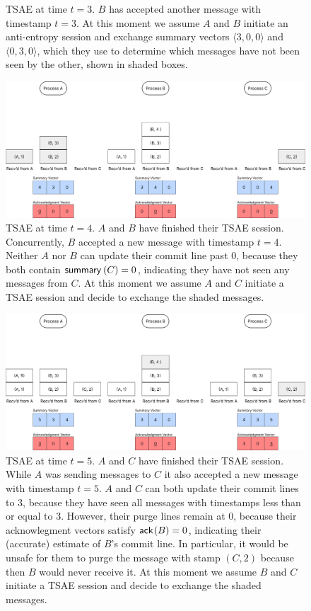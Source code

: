 \documentclass[]             %
{NASA}                       %
\theoremstyle{definition}
\begin{document}
\begin{landscape}
\begin{figure}[h]
    \caption{TSAE at time $t=3$. $B$ has accepted another message with timestamp $t = 3$. At this moment we assume $A$ and $B$ initiate an anti-entropy session and exchange summary vectors $\langle 3,0,0\rangle$ and $\langle 0,3,0 \rangle$, which they use to determine which messages have not been seen by the other, shown in shaded boxes.}
    \label{fig:tsae3}
  \end{figure}
  \begin{figure}[h]
    \centering
    \includegraphics[width=1.4\textwidth]{images/tsae/TSAE4.png}
    \caption{TSAE at time $t=4$. $A$ and $B$ have finished their TSAE session. Concurrently, $B$ accepted a new message with timestamp $t=4$. Neither $A$ nor $B$ can update their commit line past $0$, because they both contain $\textsf{summary}_{}\left(C\right) = 0$, indicating they have not seen any messages from $C$. At this moment we assume $A$ and $C$ initiate a TSAE session and decide to exchange the shaded messages.}
    \label{fig:tsae4}
  \end{figure}
  \begin{figure}[h]
    \centering
    \includegraphics[width=1.4\textwidth]{images/tsae/TSAE5.png}
    \caption{TSAE at time $t=5$. $A$ and $C$ have finished their TSAE session. While $A$ was sending messages to $C$ it also accepted a new message with timestamp $t=5$. $A$ and $C$ can both update their commit lines to $3$, because they have seen all messages with timestamps less than or equal to $3$. However, their purge lines remain at $0$, because their acknowlegment vectors satisfy $\textsf{ack}_{\!}\left(B\right) = 0$, indicating their (accurate) estimate of $B$'s commit line. In particular, it would be unsafe for them to purge the message with stamp $(C, 2)$ because then $B$ would never receive it. At this moment we assume $B$ and $C$ initiate a TSAE session and decide to exchange the shaded messages.}

\end{figure}
\end{landscape}
\end{document}
